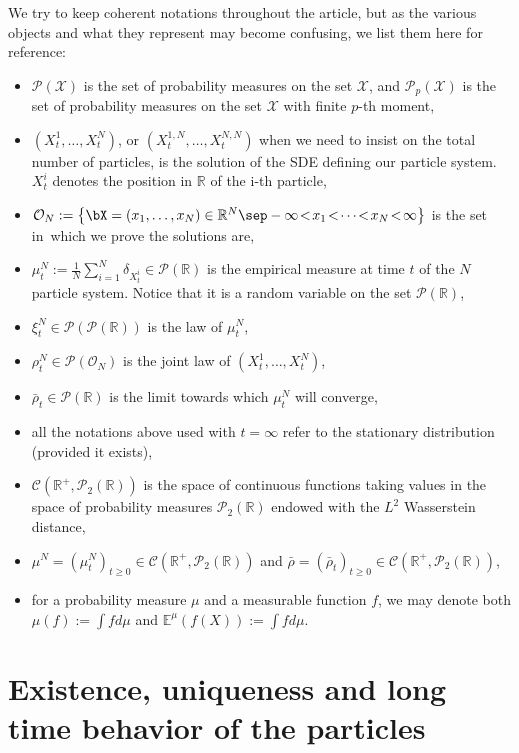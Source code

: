 We try to keep coherent notations throughout the article, but as the various objects and what they represent may become confusing, we list them here for reference:
\begin{itemize}
\item $\mathcal{P}(\mathcal{X})$ is the set of probability measures on the set $\mathcal{X}$, and $\mathcal{P}_p(\mathcal{X})$ is the set of probability measures on the set $\mathcal{X}$ with finite $p$-th moment,
\item $(X^1_t,\dots,X^N_t)$, or $(X^{1,N}_t,\dots,X^{N,N}_t)$ when we need to insist on the total number of particles, is the solution of the SDE defining our particle system. $X^i_t$ denotes the position in $\mathbb{R}$ of the i-th particle,
\item $\mathcal{O}_N:=\left\{\bX=(x_1,\dots,x_N)\in\mathbb{R}^N\sep -\infty\!<\!x_1\!<\!\cdots\!<\!x_N\!<\!\infty\right\}$ is the set in~which we prove the solutions are,
\item $\mu^N_t:=\frac{1}{N}\sum_{i=1}^N\delta_{X^i_t}\in\mathcal{P}(\mathbb{R})$ is the empirical measure at time $t$ of the $N$ particle system. Notice that it is a random variable on the set $\mathcal{P}(\mathbb{R})$,
\item $\xi^N_t\in\mathcal{P}(\mathcal{P}(\mathbb{R}))$ is the law of $\mu^N_t$,
\item $\rho^N_t\in\mathcal{P}(\mathcal{O}_N)$ is the joint law of $(X^1_t,\dots,X^N_t)$,
\item $\bar{\rho}_t\in\mathcal{P}(\mathbb{R})$ is the limit towards which $\mu^N_t$ will converge,
\item all the notations above used with $t=\infty$ refer to the stationary distribution (provided it exists),
\item $\mathcal{C}(\mathbb{R}^+,\mathcal{P}_2(\mathbb{R}))$ is the space of continuous functions taking values in the space of probability measures $\mathcal{P}_2(\mathbb{R})$ endowed with the $L^2$ Wasserstein distance,
\item $\mu^N=(\mu^N_t)_{t\geq0}\in\mathcal{C}(\mathbb{R}^+,\mathcal{P}_2(\mathbb{R}))$ and $\bar{\rho}=(\bar{\rho}_t)_{t\geq0}\in\mathcal{C}(\mathbb{R}^+,\mathcal{P}_2(\mathbb{R}))$,
\item for a probability measure $\mu$ and a measurable function $f$, we may denote both $\mu(f):=\int fd\mu$ and ${\mathbb{E}^{\mu}(f(X)):=\int fd\mu}$.
\end{itemize}

\section{Existence, uniqueness and long time behavior of the particles}\label{sec_some_results}

